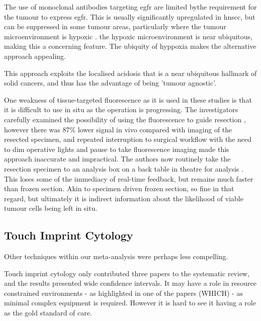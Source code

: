 
The use of monoclonal antibodies targeting \gls{egfr} are limited bythe requirement for the tumour to express \gls{egfr}.
This is usually significantly upregulated in \gls{hnscc}, but can be suppressed in some tumour areas, particularly where the tumour microenvironment is hypoxic \cite{mayerDownregulationEGFRHypoxic2016}.
the hypoxic microenvironment is near ubiquitous, making this a concerning feature.
The ubiquity of hyppoxia makes the alternative approach appealing.

This approach exploits the localised acidosis that is a near ubiquitous hallmark of solid cancers, and thus has the advantage of being 'tumour agnostic'.

One weakness of tissue-targeted fluorescence as it is used in these studies is that it is difficult to use in situ as the operation is progressing. 
The investigators carefully examined the possibility of using the fluorescence to guide resection \cite{mooreCharacterizingUtilityLimitations2017}, however there was 87\% lower signal in vivo compared with imaging of the resected specimen, and repeated interruption to surgical workflow with the need to dim operative lights and pause to take fluorescence imaging made this approach inaccurate and impractical. 
The authors now routinely take the resection specimen to an analysis box on a back table in theatre for analysis \cite{gaor.w.DeterminationTumorMargins2018}. 
This loses some of the immediacy of real-time feedback, but remains much faster than frozen section.
Akin to specimen driven frozen section, so fine in that regard, but ultimately it is indirect information about the likelihood of viable tumour cells being left in situ.

\subsection{Touch Imprint Cytology}

Other techniques within our meta-analysis were perhaps less compelling.

Touch imprint cytology only contributed three papers to the systematic review, and the results presented wide confidence intervals. 
It may have a role in resource constrained environments - as highlighted in one of the papers (WHICH) - as minimal complex equipment is required. 
However it is hard to see it having a role as the gold standard of care.


